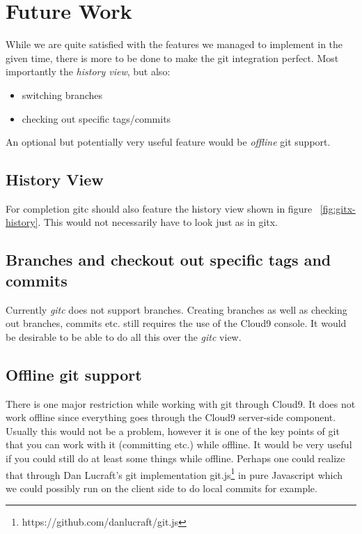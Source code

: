 \section{Future Work}
\label{sec:Future_Work}

While we are quite satisfied with the features we managed to implement in the given time,
there is more to be done to make the git integration perfect.
Most importantly the \emph{history view}, but also:
\begin{itemize}
	\item switching branches
	\item checking out specific tags/commits
\end{itemize}
An optional but potentially very useful feature would be \emph{offline} git support.

\subsection{History View}
\label{sec:history-view}

For completion gitc should also feature the history view shown in figure ~\ref{fig:gitx-history}.
This would not necessarily have to look just as in gitx.

\subsection{Branches and checkout out specific tags and commits}
\label{sec:branches}

Currently \emph{gitc} does not support branches. Creating branches as well as checking out branches,
commits etc. still requires the use of the Cloud9 console. It would be desirable to be able to do all
this over the \emph{gitc} view.

\subsection{Offline git support}
\label{sec:offline-git-support}

There is one major restriction while working with git through Cloud9. It does not work offline since everything goes through the Cloud9 server-side component.
Usually this would not be a problem, however it is one of the key points of git that you can work with it (committing etc.)
while offline.
It would be very useful if you could still do at least some things while offline.
Perhaps one could realize that through Dan Lucraft's git implementation git.js\footnote{https://github.com/danlucraft/git.js} in pure Javascript which we could possibly run on the client side to do local commits for example.
